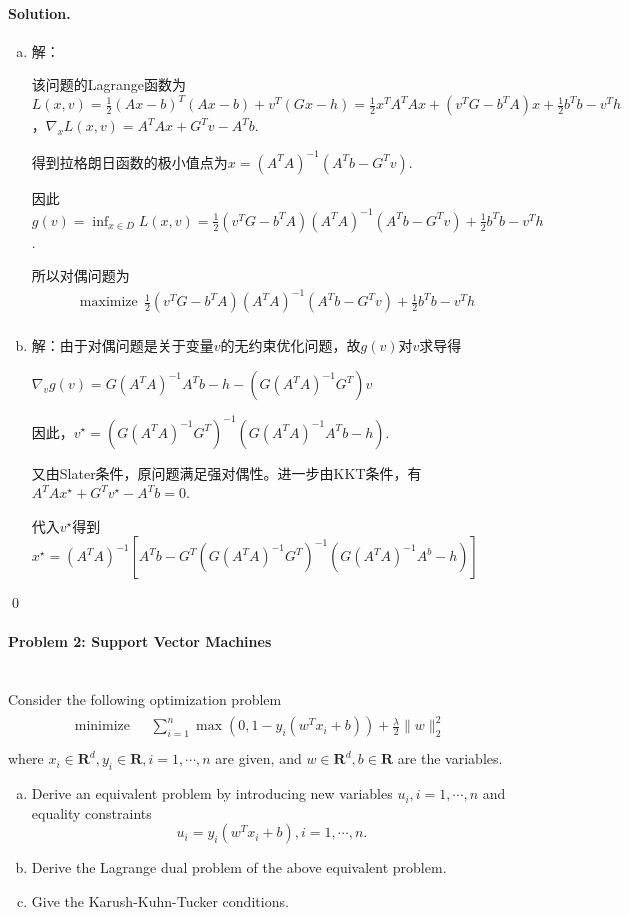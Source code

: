 \documentclass[a4paper]{article}
\newenvironment{solution}
{\color{blue} \paragraph{Solution.}}
{\newline \qed}
\begin{document}
\begin{solution}
    \begin{enumerate}[a)]
        \item 解：
        
                该问题的Lagrange函数为$L(x, v)=\frac 12(Ax-b)^T(Ax-b)+v^T(Gx-h)=\frac 12 x^TA^TAx+(v^TG-b^TA)x+\frac 12b^Tb-v^Th$，$\nabla_xL(x, v)=A^TAx+G^Tv-A^Tb$.

                得到拉格朗日函数的极小值点为$x=(A^TA)^{-1}(A^Tb-G^Tv)$.

                因此$g(v) = \inf_{x\in D}L(x, v) = \frac 12(v^TG-b^TA)(A^TA)^{-1}(A^Tb-G^Tv)+\frac 12b^Tb-v^Th$.

                所以对偶问题为
                \begin{equation}
                    \begin{split}
                        &\text{maximize}\ \ \frac 12(v^TG-b^TA)(A^TA)^{-1}(A^Tb-G^Tv)+\frac 12b^Tb-v^Th\\
                    \end{split}
                \end{equation}

        \item 解：由于对偶问题是关于变量$v$的无约束优化问题，故$g(v)$对$v$求导得
        
                $\nabla_vg(v)=G(A^TA)^{-1}A^Tb-h-(G(A^TA)^{-1}G^T)v$

                因此，$v^{\star}=(G(A^TA)^{-1}G^T)^{-1}(G(A^TA)^{-1}A^Tb-h)$.

                又由Slater条件，原问题满足强对偶性。进一步由KKT条件，有$A^TAx^\star+G^Tv^\star-A^Tb=0$.

                代入$v^\star$得到$x^\star=(A^TA)^{-1}[A^Tb-G^T(G(A^TA)^{-1}G^T)^{-1}(G(A^TA)^{-1}A^b-h)]$
    \end{enumerate}
\end{solution}

\paragraph{Problem 2: Support Vector Machines}
~\\
Consider the following optimization problem
\begin{gather*}
\begin{matrix}
\text{minimize~~} & \sum_{i=1}^n\max\left(0,1-y_i(w^Tx_i+b)\right)+\frac{\lambda}{2}\|w\|_2^2\\
\end{matrix}
\end{gather*}
where $x_i\in\mathbf{R}^{d},y_i\in \mathbf{R},i=1,\cdots,n$ are given, and $w\in \mathbf{R}^d,b\in\mathbf{R}$ are the variables.
\begin{enumerate}[a)]
    \item Derive an equivalent problem by introducing new variables $u_i,i=1,\cdots,n$ and equality constraints \[u_i=y_i(w^Tx_i+b),i=1,\cdots,n.\]
    \item Derive the Lagrange dual problem of the above equivalent problem.
    \item Give the Karush-Kuhn-Tucker conditions.
\end{enumerate}
\end{document}
